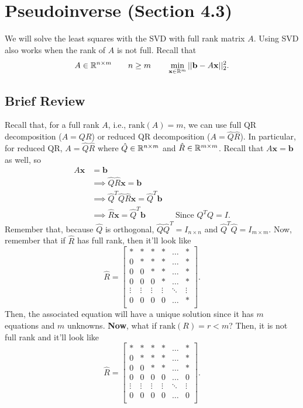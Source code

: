 \documentclass[letterpaper]{article}
\newcommand{\0}{\mathbf{0}}
\renewcommand{\b}{\mathbf{b}}
\newcommand{\x}{\mathbf{x}}
\begin{document}
\section{Pseudoinverse (Section 4.3)}
We will solve the least squares with the SVD with full rank matrix $A$. Using SVD also works when the rank of $A$ is not full. Recall that 
\[A \in \R^{n \times m} \qquad n \geq m \qquad \min_{\x \in \R^m} ||\b - A\x||_2^2.\]

\subsection{Brief Review}
Recall that, for a full rank $A$, i.e., $\text{rank}(A) = m$, we can use full QR decomposition ($A = QR$) or reduced QR decomposition ($A = \hat{Q}\hat{R}$). In particular, for reduced QR, $A = \hat{Q}\hat{R}$ where $\hat{Q} \in \mathbb{R}^{n \times m}$ and $\hat{R} \in \mathbb{R}^{m \times m}$. Recall that $A\x = \b$ as well, so 
\begin{equation*}
    \begin{aligned}
        A\x &= \b \\ 
            &\implies \hat{Q}\hat{R}\x = \b \\ 
            &\implies \hat{Q}^{T}\hat{Q}\hat{R}\x = \hat{Q}^{T}\b \\ 
            &\implies \hat{R}\x = \hat{Q}^{T}\b && \text{Since } Q^T Q = I.
    \end{aligned}
\end{equation*}
Remember that, because $\hat{Q}$ is orthogonal, $\hat{Q} \hat{Q}^T = I_{n \times n}$ and $\hat{Q}^T \hat{Q} = I_{m \times m}$. Now, remember that if $\hat{R}$ has full rank, then it'll look like 
\[\hat{R} = \begin{bmatrix}
    * & * & * & * & \hdots & * \\ 
    0 & * & * & * & \hdots & * \\ 
    0 & 0 & * & * & \hdots & * \\ 
    0 & 0 & 0 & * & \hdots & * \\ 
    \vdots & \vdots & \vdots & \vdots & \ddots & \vdots \\ 
    0 & 0 & 0 & 0 & \hdots & * \\ 
\end{bmatrix}.\]
Then, the associated equation will have a unique solution since it has $m$ equations and $m$ unknowns. \textbf{Now}, what if $\text{rank}(R) = r < m$? Then, it is not full rank and it'll look like 
\[\hat{R} = \begin{bmatrix}
    * & * & * & * & \hdots & * \\ 
    0 & * & * & * & \hdots & * \\ 
    0 & 0 & * & * & \hdots & * \\ 
    0 & 0 & 0 & 0 & \hdots & 0 \\ 
    \vdots & \vdots & \vdots & \vdots & \ddots & \vdots \\ 
    0 & 0 & 0 & 0 & \hdots & 0 \\ 
\end{bmatrix}.\]
\end{document}
